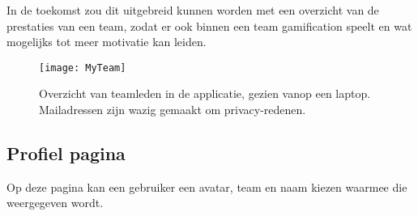 In de toekomst zou dit uitgebreid kunnen worden met een overzicht van de prestaties van een team, zodat er ook binnen een team gamification speelt en wat mogelijks tot meer motivatie kan leiden.

\begin{figure}[h]
    \caption[Overzicht van teamleden]{Overzicht van teamleden in de applicatie, gezien vanop een laptop. Mailadressen zijn wazig gemaakt om privacy-redenen.}
    \texttt{[image: MyTeam]}
    \label{fig:team}
\end{figure}

\subsection{Profiel pagina}

Op deze pagina kan een gebruiker een avatar, team en naam kiezen waarmee die weergegeven wordt.